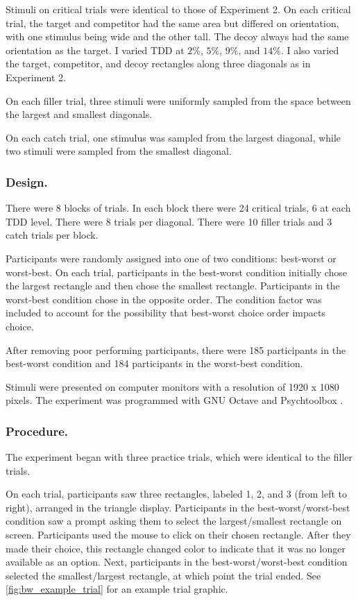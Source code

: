 Stimuli on critical trials were identical to those of Experiment 2. On each critical trial, the target and competitor had the same area but differed on orientation, with one stimulus being wide and the other tall. The decoy always had the same orientation as the target. I varied TDD at $2\%$, $5\%$, $9\%$, and $14\%$. I also varied the target, competitor, and decoy rectangles along three diagonals as in Experiment 2. 

On each filler trial, three stimuli were uniformly sampled from the space between the largest and smallest diagonals.

On each catch trial, one stimulus was sampled from the largest diagonal, while two stimuli were sampled from the smallest diagonal.

\subsubsection{Design.}
There were 8 blocks of trials. In each block there were 24 critical trials, 6 at each TDD level. There were 8 trials per diagonal. There were 10 filler trials and 3 catch trials per block.

Participants were randomly assigned into one of two conditions: best-worst or worst-best. On each trial, participants in the best-worst condition initially chose the largest rectangle and then chose the smallest rectangle. Participants in the worst-best condition chose in the opposite order. The condition factor was included to account for the possibility that best-worst choice order impacts choice.

After removing poor performing participants, there were 185 participants in the best-worst condition and 184 participants in the worst-best condition.

Stimuli were presented on computer monitors with a resolution of 1920 x 1080 pixels. The experiment was programmed with GNU Octave and Psychtoolbox \parencite{octave,brainardPsychophysicsToolbox1997}. 

\subsubsection{Procedure.}

The experiment began with three practice trials, which were identical to the filler trials. 

On each trial, participants saw three rectangles, labeled 1, 2, and 3 (from left to right), arranged in the triangle display. Participants in the best-worst/worst-best condition saw a prompt asking them to select the largest/smallest rectangle on screen. Participants used the mouse to click on their chosen rectangle. After they made their choice, this rectangle changed color to indicate that it was no longer available as an option. Next, participants in the best-worst/worst-best condition selected the smallest/largest rectangle, at which point the trial ended. See \ref{fig:bw_example_trial} for an example trial graphic.


